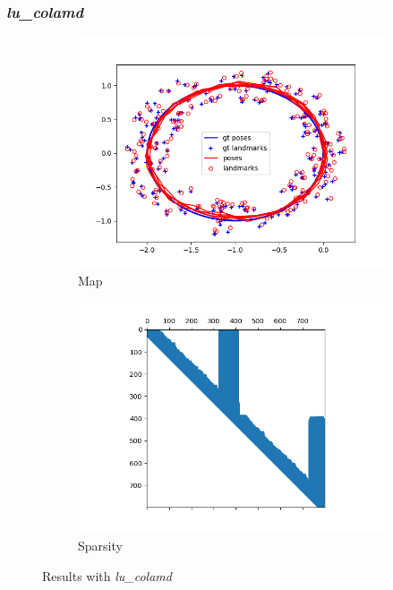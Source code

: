 \documentclass[12pt, a4paper]{article}
\begin{document}
\subsubsection{\textit{lu\_colamd}}
\begin{figure}[H]
  \centering
  \begin{subfigure}[b]{0.45\textwidth}
    \includegraphics[width=\textwidth]{./results/linear/lu_colamd_2d_linear_loop_map.png}
    \caption{Map}
  \end{subfigure}
  \hfill
  \begin{subfigure}[b]{0.45\textwidth}
    \includegraphics[width=\textwidth]{./results/linear/lu_colamd_2d_linear_loop_sparsity.png}
    \caption{Sparsity}
  \end{subfigure}
  \caption{Results with \textit{lu\_colamd}}
\end{figure}
\end{document}
